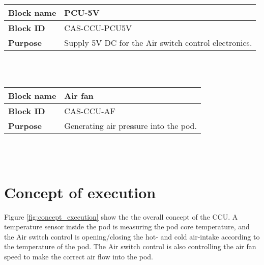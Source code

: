 \begin{tabular}{|l|p{10cm}|}
    \hline
    \textbf{Block name}     & PCU-5V \\
    \hline
    \textbf{Block ID}       & CAS-CCU-PCU5V \\
    \hline
    \textbf{Purpose}        & Supply 5V DC for the Air switch control electronics. \\
    \hline
\end{tabular}\\\\

\begin{tabular}{|l|p{10cm}|}
    \hline
    \textbf{Block name}     & Air fan \\
    \hline
    \textbf{Block ID}       & CAS-CCU-AF \\
    \hline
    \textbf{Purpose}        & Generating air pressure into the pod. \\
    \hline
\end{tabular}\\\\

\pagebreak

\section{Concept of execution}
\label{sec:concept_execution}

Figure \ref{fig:concept_execution} show the the overall concept of the CCU. A temperature sensor inside the pod is measuring the pod core temperature, and the Air switch control is opening/closing the hot- and cold air-intake according to the temperature of the pod. The Air switch control is also controlling the air fan speed to make the correct air flow into the pod.


